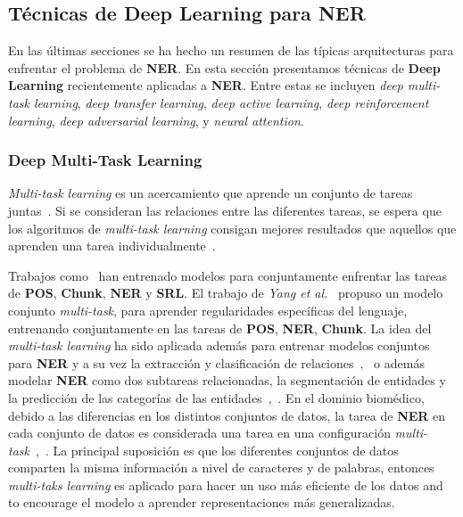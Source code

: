 \subsection{T\'ecnicas de Deep Learning para NER}
En las \'ultimas secciones se ha hecho un resumen de las t\'ipicas arquitecturas para enfrentar el problema de \textbf{NER}. En esta secci\'on presentamos t\'ecnicas de \textbf{Deep Learning} recientemente aplicadas a \textbf{NER}. Entre estas se incluyen \emph{deep multi-task learning}, \emph{deep transfer learning}, \emph{deep active learning}, \emph{deep reinforcement learning}, \emph{deep adversarial learning}, y \emph{neural attention}.

\subsubsection{Deep Multi-Task Learning}

\emph{Multi-task learning} es un acercamiento que aprende un conjunto de tareas juntas~\cite{caruana1997multitask}. Si se consideran las relaciones entre las diferentes tareas, se espera que los algoritmos de \emph{multi-task learning} consigan mejores resultados que aquellos que aprenden una tarea individualmente~\cite{li2018survey}.

Trabajos como~\cite{collobert2011natural} han entrenado modelos para conjuntamente enfrentar las tareas de \textbf{POS}, \textbf{Chunk}, \textbf{NER} y \textbf{SRL}. El trabajo de \emph{Yang et al.}~\cite{yang2016multi} propuso un modelo conjunto \emph{multi-task}, para aprender regularidades espec\'ificas del lenguaje, entrenando conjuntamente en las tareas de \textbf{POS}, \textbf{NER}, \textbf{Chunk}. La idea del \emph{multi-task learning} ha sido aplicada adem\'as para entrenar modelos conjuntos para \textbf{NER} y a su vez la extracci\'on y clasificaci\'on de relaciones~\cite{zheng2017joint},~\cite{zhou2017joint} o adem\'as modelar \textbf{NER} como dos subtareas relacionadas, la segmentaci\'on de entidades y la predicci\'on de las categor\'ias  de las entidades~\cite{aguilar2019multi},~\cite{peng2016multi}. En el dominio biom\'edico, debido a las diferencias en los distintos conjuntos de datos, la tarea de \textbf{NER} en cada conjunto de datos es considerada una tarea en una configuraci\'on \emph{multi-task}~\cite{crichton2017neural},~\cite{wang2019cross}. La principal suposici\'on es que los diferentes conjuntos de datos comparten la misma informaci\'on a nivel de caracteres y de palabras, entonces \emph{multi-taks learning} es aplicado para hacer un uso m\'as eficiente de los datos and to encourage el modelo a aprender representaciones m\'as generalizadas.


